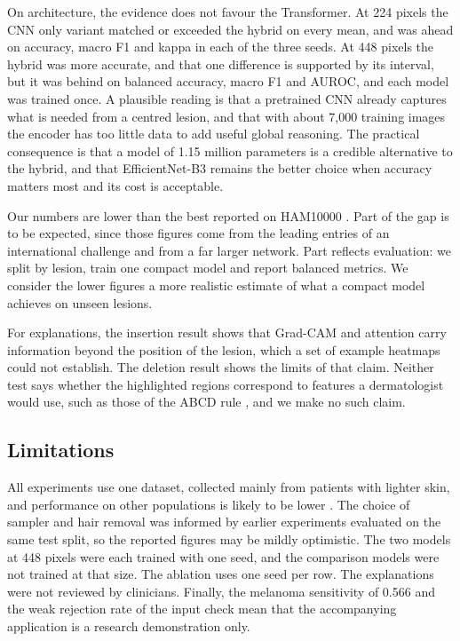 \documentclass[runningheads]{llncs}
\begin{document}
On architecture, the evidence does not favour the Transformer. At 224 pixels the CNN only variant matched or exceeded the hybrid on every mean, and was ahead on accuracy, macro F1 and kappa in each of the three seeds. At 448 pixels the hybrid was more accurate, and that one difference is supported by its interval, but it was behind on balanced accuracy, macro F1 and AUROC, and each model was trained once. A plausible reading is that a pretrained CNN already captures what is needed from a centred lesion, and that with about 7,000 training images the encoder has too little data to add useful global reasoning. The practical consequence is that a model of 1.15 million parameters is a credible alternative to the hybrid, and that EfficientNet-B3 remains the better choice when accuracy matters most and its cost is acceptable.

Our numbers are lower than the best reported on HAM10000 \cite{codella2019,haque2026}. Part of the gap is to be expected, since those figures come from the leading entries of an international challenge and from a far larger network. Part reflects evaluation: we split by lesion, train one compact model and report balanced metrics. We consider the lower figures a more realistic estimate of what a compact model achieves on unseen lesions.

For explanations, the insertion result shows that Grad-CAM and attention carry information beyond the position of the lesion, which a set of example heatmaps could not establish. The deletion result shows the limits of that claim. Neither test says whether the highlighted regions correspond to features a dermatologist would use, such as those of the ABCD rule \cite{nachbar1994}, and we make no such claim.

\subsection{Limitations}

All experiments use one dataset, collected mainly from patients with lighter skin, and performance on other populations is likely to be lower \cite{daneshjou2022}. The choice of sampler and hair removal was informed by earlier experiments evaluated on the same test split, so the reported figures may be mildly optimistic. The two models at 448 pixels were each trained with one seed, and the comparison models were not trained at that size. The ablation uses one seed per row. The explanations were not reviewed by clinicians. Finally, the melanoma sensitivity of 0.566 and the weak rejection rate of the input check mean that the accompanying application is a research demonstration only.
\end{document}
